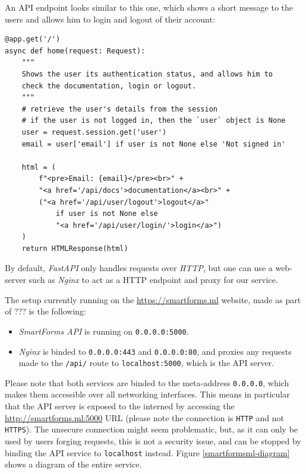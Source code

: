 \documentclass[11pt, a4paper]{report}
\def\code#1{\texttt{#1}}
\begin{document}
An API endpoint looks similar to this one, which shows a short message to the users and allows him to login and logout of their account:

\begin{verbatim}
@app.get('/')
async def home(request: Request):
    """
    Shows the user its authentication status, and allows him to
    check the documentation, login or logout.
    """
    # retrieve the user's details from the session
    # if the user is not logged in, then the `user` object is None
    user = request.session.get('user')
    email = user['email'] if user is not None else 'Not signed in'

    html = (
        f"<pre>Email: {email}</pre><br>" +
        "<a href='/api/docs'>documentation</a><br>" +
        ("<a href='/api/user/logout'>logout</a>"
            if user is not None else
            "<a href='/api/user/login/'>login</a>")
    )
    return HTMLResponse(html)
\end{verbatim}

By default, \textit{FastAPI} only handles requests over \textit{HTTP}, but one can use a web-server such as \textit{Nginx}\cite{nginx} to act as a HTTP endpoint and proxy for our service.

The setup currently running on the \url{https://smartforms.ml} website, made as part of ???\cite{felix} is the following:
\begin{itemize}
	\item \textit{SmartForms API} is running on \code{0.0.0.0:5000}.
	\item \textit{Nginx} is binded to \code{0.0.0.0:443} and \code{0.0.0.0:80}, and proxies any requests made to the \code{/api/} route to \code{localhost:5000}, which is the API server. 
\end{itemize}

Please note that both services are binded to the meta-address \code{0.0.0.0}, which makes them accessible over all networking interfaces. This means in particular that the API server is exposed to the interned by accessing the \url{http://smartforms.ml:5000} URL (please note the connection is \code{HTTP} and not \code{HTTPS}). The unsecure connection might seem problematic, but, as it can only be used by users forging requests, this is not a security issue, and can be stopped by binding the API service to \code{localhost} instead. Figure \ref{smartformsml-diagram} shows a diagram of the entire service.
\end{document}
